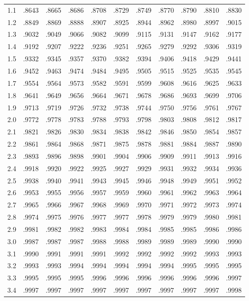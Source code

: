 \documentclass[11pt]{article}
\begin{document}
\begin{center}
{\begin{tabular}{|c|cccccccccc|}
1.1 & .8643 & .8665 & .8686 & .8708 & .8729 & .8749 & .8770 & .8790 & .8810 & .8830 \\
1.2 & .8849 & .8869 & .8888 & .8907 & .8925 & .8944 & .8962 & .8980 & .8997 & .9015 \\
1.3 & .9032 & .9049 & .9066 & .9082 & .9099 & .9115 & .9131 & .9147 & .9162 & .9177 \\
1.4 & .9192 & .9207 & .9222 & .9236 & .9251 & .9265 & .9279 & .9292 & .9306 & .9319 \\
\hline
1.5 & .9332 & .9345 & .9357 & .9370 & .9382 & .9394 & .9406 & .9418 & .9429 & .9441 \\
1.6 & .9452 & .9463 & .9474 & .9484 & .9495 & .9505 & .9515 & .9525 & .9535 & .9545 \\
1.7 & .9554 & .9564 & .9573 & .9582 & .9591 & .9599 & .9608 & .9616 & .9625 & .9633 \\
1.8 & .9641 & .9649 & .9656 & .9664 & .9671 & .9678 & .9686 & .9693 & .9699 & .9706 \\
1.9 & .9713 & .9719 & .9726 & .9732 & .9738 & .9744 & .9750 & .9756 & .9761 & .9767 \\
\hline
2.0 & .9772 & .9778 & .9783 & .9788 & .9793 & .9798 & .9803 & .9808 & .9812 & .9817 \\
2.1 & .9821 & .9826 & .9830 & .9834 & .9838 & .9842 & .9846 & .9850 & .9854 & .9857 \\
2.2 & .9861 & .9864 & .9868 & .9871 & .9875 & .9878 & .9881 & .9884 & .9887 & .9890 \\
2.3 & .9893 & .9896 & .9898 & .9901 & .9904 & .9906 & .9909 & .9911 & .9913 & .9916 \\
2.4 & .9918 & .9920 & .9922 & .9925 & .9927 & .9929 & .9931 & .9932 & .9934 & .9936 \\
\hline
2.5 & .9938 & .9940 & .9941 & .9943 & .9945 & .9946 & .9948 & .9949 & .9951 & .9952 \\
2.6 & .9953 & .9955 & .9956 & .9957 & .9959 & .9960 & .9961 & .9962 & .9963 & .9964 \\
2.7 & .9965 & .9966 & .9967 & .9968 & .9969 & .9970 & .9971 & .9972 & .9973 & .9974 \\
2.8 & .9974 & .9975 & .9976 & .9977 & .9977 & .9978 & .9979 & .9979 & .9980 & .9981 \\
2.9 & .9981 & .9982 & .9982 & .9983 & .9984 & .9984 & .9985 & .9985 & .9986 & .9986 \\
\hline
3.0 & .9987 & .9987 & .9987 & .9988 & .9988 & .9989 & .9989 & .9989 & .9990 & .9990 \\
3.1 & .9990 & .9991 & .9991 & .9991 & .9992 & .9992 & .9992 & .9992 & .9993 & .9993 \\
3.2 & .9993 & .9993 & .9994 & .9994 & .9994 & .9994 & .9994 & .9995 & .9995 & .9995 \\
3.3 & .9995 & .9995 & .9995 & .9996 & .9996 & .9996 & .9996 & .9996 & .9996 & .9997 \\
3.4 & .9997 & .9997 & .9997 & .9997 & .9997 & .9997 & .9997 & .9997 & .9997 & .9998 \\
\hline
\end{tabular}}
\end{center}
\end{document}
